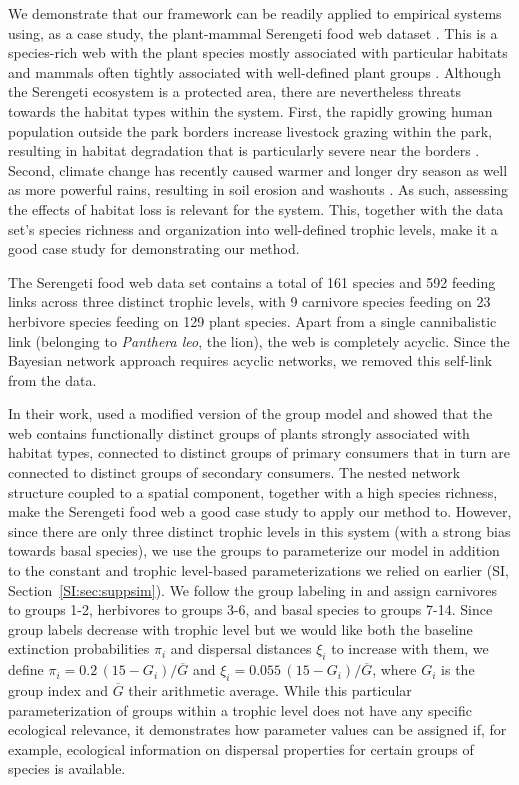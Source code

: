 \documentclass[11pt]{article}
\newcommand{\SI}{SI}
\begin{document}
We demonstrate that our framework can be readily applied to empirical systems using, as a case study, the plant-mammal Serengeti food web dataset  \citep{Baskerville2011}.  This is a species-rich web with the plant species mostly associated with particular habitats and mammals often tightly associated with well-defined plant groups \citep{Baskerville2011}. Although the Serengeti ecosystem is a protected area, there are nevertheless threats towards the habitat types within the system. First, the rapidly growing human population outside the park borders increase livestock grazing within the park, resulting in habitat degradation that is particularly severe near the borders \citep{Veldhuis2019cross}. Second, climate change has recently caused warmer and longer dry season as well as more powerful rains, resulting in soil erosion and washouts \citep{Ritchie2008global}. As such, assessing the effects of habitat loss is relevant for the system. This, together with the data set's species richness and organization into well-defined trophic levels, make it a good case study for demonstrating our method.

The Serengeti food web data set \citep{Baskerville2011} contains a total of 161 species and 592 feeding links across three distinct trophic levels, with 9 carnivore species feeding on 23 herbivore species feeding on 129 plant species. Apart from a single cannibalistic link (belonging to \textit{Panthera leo}, the lion), the web is completely acyclic. Since the Bayesian network approach requires acyclic networks, we removed this self-link from the data.

In their work, \citet{Baskerville2011} used a modified version of the group model \citep{AllesinaPascual2009ELE} and showed that the web contains functionally distinct groups of plants strongly associated with habitat types, connected to distinct groups of primary consumers that in turn are connected to distinct groups of secondary consumers. The nested network structure coupled to a spatial component, together with a high species richness, make the Serengeti food web a good case study to apply our method to. However, since there are only three distinct trophic levels in this system (with a strong bias towards basal species), we use the groups to parameterize our model in addition to the constant and trophic level-based parameterizations we relied on earlier (\SI, Section~\ref{SI:sec:suppsim}). We follow the group labeling in \citet{Baskerville2011} and assign carnivores to groups 1-2, herbivores to groups 3-6, and basal species to groups 7-14. Since group labels decrease with trophic level but we would like both the baseline extinction probabilities $\pi_i$ and dispersal distances $\xi_i$ to increase with them, we define $\pi_i = 0.2 \, (15 - G_i) / \overline{G}$ and $\xi_i = 0.055 \, (15 - G_i) / \overline{G}$, where $G_i$ is the group index and $\overline{G}$ their arithmetic average. While this particular parameterization of groups within a trophic level does not have any specific ecological relevance, it demonstrates how parameter values can be assigned if, for example, ecological information on dispersal properties for certain groups of species is available.
\end{document}
